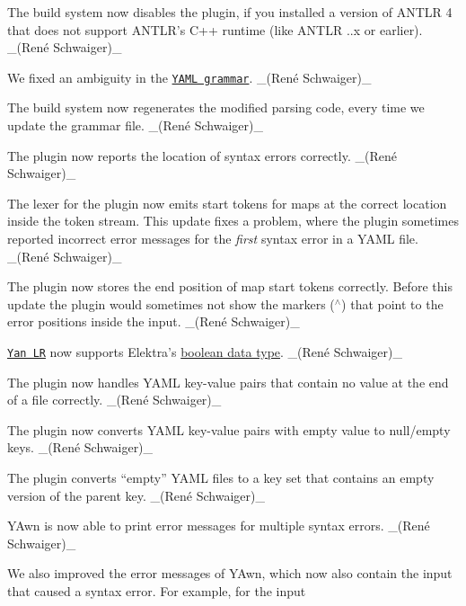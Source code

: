 \begin{DoxyItemize}
\item The build system now disables the plugin, if you installed a version of A\+N\+T\+LR 4 that does not support A\+N\+T\+L\+R’s C++ runtime (like A\+N\+T\+LR {..\+x} or earlier). \+\_\+(René Schwaiger)\+\_\+
\item We fixed an ambiguity in the \href{https://master.libelektra.org/src/plugins/yanlr/YAML.g4}{\tt Y\+A\+ML grammar}. \+\_\+(René Schwaiger)\+\_\+
\item The build system now regenerates the modified parsing code, every time we update the grammar file. \+\_\+(René Schwaiger)\+\_\+
\item The plugin now reports the location of syntax errors correctly. \+\_\+(René Schwaiger)\+\_\+
\item The lexer for the plugin now emits start tokens for maps at the correct location inside the token stream. This update fixes a problem, where the plugin sometimes reported incorrect error messages for the {\itshape first} syntax error in a Y\+A\+ML file. \+\_\+(René Schwaiger)\+\_\+
\item The plugin now stores the end position of map start tokens correctly. Before this update the plugin would sometimes not show the markers ({\ttfamily $^\wedge$}) that point to the error positions inside the input. \+\_\+(René Schwaiger)\+\_\+
\item \href{https://www.libelektra.org/plugins/yanlr}{\tt Yan LR} now supports Elektra’s \hyperlink{doc_decisions_boolean_md}{boolean data type}. \+\_\+(René Schwaiger)\+\_\+
\item The plugin now handles Y\+A\+ML key-\/value pairs that contain no value at the end of a file correctly. \+\_\+(René Schwaiger)\+\_\+
\item The plugin now converts Y\+A\+ML key-\/value pairs with empty value to null/empty keys. \+\_\+(René Schwaiger)\+\_\+
\item The plugin converts “empty” Y\+A\+ML files to a key set that contains an empty version of the parent key. \+\_\+(René Schwaiger)\+\_\+
\end{DoxyItemize}


\begin{DoxyItemize}
\item Y\+Awn is now able to print error messages for multiple syntax errors. \+\_\+(René Schwaiger)\+\_\+
\item We also improved the error messages of Y\+Awn, which now also contain the input that caused a syntax error. For example, for the input
\end{DoxyItemize}


